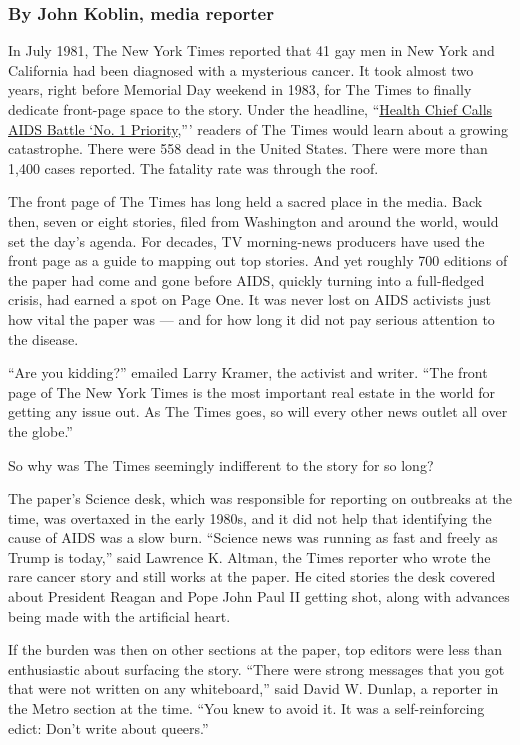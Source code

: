 \hypertarget{by-john-koblin-media-reporter}{%
\subsubsection{By John Koblin, media
reporter}\label{by-john-koblin-media-reporter}}

In July 1981, The New York Times reported that 41 gay men in New York
and California had been diagnosed with a mysterious cancer. It took
almost two years, right before Memorial Day weekend in 1983, for The
Times to finally dedicate front-page space to the story. Under the
headline,
``\href{https://www.nytimes.com/1983/05/25/us/health-chief-calls-aids-battle-no-1-priority.html}{Health
Chief Calls AIDS Battle `No. 1 Priority},''' readers of The Times would
learn about a growing catastrophe. There were 558 dead in the United
States. There were more than 1,400 cases reported. The fatality rate was
through the roof.

The front page of The Times has long held a sacred place in the media.
Back then, seven or eight stories, filed from Washington and around the
world, would set the day's agenda. For decades, TV morning-news
producers have used the front page as a guide to mapping out top
stories. And yet roughly 700 editions of the paper had come and gone
before AIDS, quickly turning into a full-fledged crisis, had earned a
spot on Page One. It was never lost on AIDS activists just how vital the
paper was --- and for how long it did not pay serious attention to the
disease.

``Are you kidding?'' emailed Larry Kramer, the activist and writer.
``The front page of The New York Times is the most important real estate
in the world for getting any issue out. As The Times goes, so will every
other news outlet all over the globe.''

So why was The Times seemingly indifferent to the story for so long?

The paper's Science desk, which was responsible for reporting on
outbreaks at the time, was overtaxed in the early 1980s, and it did not
help that identifying the cause of AIDS was a slow burn. ``Science news
was running as fast and freely as Trump is today,'' said Lawrence K.
Altman, the Times reporter who wrote the rare cancer story and still
works at the paper. He cited stories the desk covered about President
Reagan and Pope John Paul II getting shot, along with advances being
made with the artificial heart.

If the burden was then on other sections at the paper, top editors were
less than enthusiastic about surfacing the story. ``There were strong
messages that you got that were not written on any whiteboard,'' said
David W. Dunlap, a reporter in the Metro section at the time. ``You knew
to avoid it. It was a self-reinforcing edict: Don't write about
queers.''

